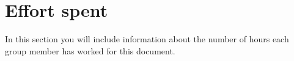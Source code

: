 \section{Effort spent}
In this section you will include information about the number of hours each group member has worked for this document.